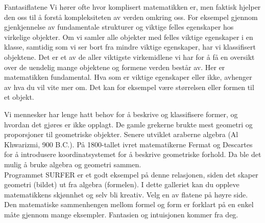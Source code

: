 \begin{surferIntroPage}{Fantasiflatene}
Vi hører ofte hvor komplisert matematikken er, men faktisk hjelper den oss til å forstå kompleksiteten av verden omkring oss. For eksempel gjennom gjenkjennelse av fundamentale strukturer og viktige felles egenskaper hos virkelige objekter. Om vi samler alle objekter med felles viktige egenskaper i en klasse, samtidig som vi ser bort fra mindre viktige egenskaper, har vi klassifisert objektene. Det er et av de aller viktigste virkemidlene vi har for å få en oversikt over de uendelig mange objektene og formene verden består av. Her er matematikken fundamental. Hva som er viktige egenskaper eller ikke, avhenger av hva du vil vite mer om.  Det kan for eksempel være størrelsen eller formen til et objekt.  
\\

\vspace{0.4cm}

Vi mennesker har lenge hatt behov for å beskrive og klassifisere former, og hvordan det gjøres er ikke opplagt. De gamle grekerne brukte mest geometri og proporsjoner til geometriske objekter. Senere utviklet araberne algebra (Al Khwarizmi, 900 B.C.). På 1800-tallet ivret matematikerne Fermat og Descartes for å introdusere koordinatsystemet for å beskrive geometriske forhold. Da ble det mulig å bruke algebra og geometri sammen.  
\\
\vspace{0.4cm}
Programmet SURFER er et godt eksempel på denne relasjonen, siden det skaper geometri (bildet) ut fra algebra (formelen). I dette galleriet kan du oppleve matematikkens skjønnhet og selv bli kreativ. Velg en av flatene på høyre side. Den matematiske sammenhengen mellom formel og form er forklart på en enkel måte gjennom mange eksempler. Fantasien og intuisjonen kommer fra deg.
\end{surferIntroPage}
